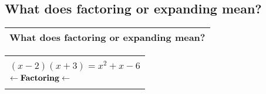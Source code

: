 \subsection{What does factoring or expanding mean?}
\begin{small}
    \begin{tabularx}{1\textwidth}{
            p{}
        }
        \toprule
            What does factoring or expanding mean?
        \\
        \bottomrule
    \end{tabularx}
\end{small}
\begin{small}
    \begin{tabularx}{1\textwidth}{
            p{}
        }

        \toprule
        \makecell{
            $ \rightarrow \text{\textbf{Expanding}} \rightarrow $\\
            $ \left(x-2\right)\left(x+3\right) = x^2+x-6 $ \\
            $ \leftarrow \text{\textbf{Factoring}} \leftarrow $\\
        }
        \\
        \bottomrule
    \end{tabularx}
\end{small}
